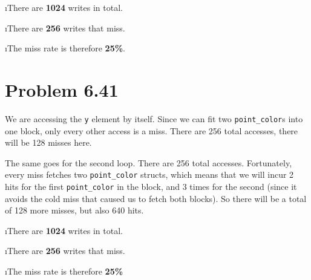 \documentclass[fleqn]{article}
\begin{document}
\bee

\i There are \textbf{1024} writes in total.

\i There are \textbf{256} writes that miss.

\i The miss rate is therefore \textbf{25\%}.

\ene

\section{Problem 6.41}

We are accessing the \texttt{y} element by itself. Since we can fit two \texttt{point\_color}s into one block, only every other access is a miss. There are 256 total accesses, there will be 128 misses here.

The same goes for the second loop. There are 256 total accesses. Fortunately, every miss fetches two \texttt{point\_color} structs, which means that we will incur 2 hits for the first \texttt{point\_color} in the block, and 3 times for the second (since it avoids the cold miss that caused us to fetch both blocks). So there will be a total of 128 more misses, but also 640 hits.

\bee

\i There are \textbf{1024} writes in total.

\i There are \textbf{256} writes that miss.

\i The miss rate is therefore \textbf{25\%}

\ene
\end{document}
